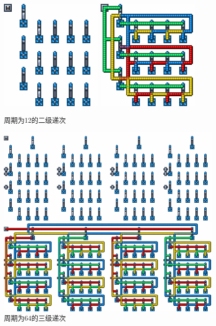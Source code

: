 \begin{figure}[!ht]
    \centering
    \includegraphics{images/313.png}
    \qquad
    \includegraphics{images/314.png}
    \caption{周期为12的二级递次}\label{fig31}
\end{figure}
\begin{figure}[!ht]
    \centering
    \includegraphics[width=\textwidth]{images/316.png}

    \includegraphics[width=\textwidth]{images/315.png}
    \caption{周期为64的三级递次}\label{fig32}
\end{figure}

